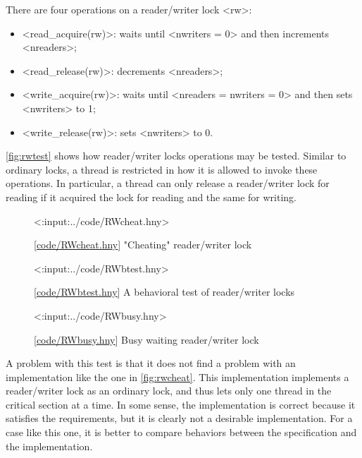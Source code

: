 \documentclass{report}
\newcommand{\harmonylink}[1]{%
[\href{https://harmony.cs.cornell.edu/#1}{\underline{#1}}]%
}
\newenvironment{code}{
\tcolorbox
}{
\endtcolorbox
}
\begin{document}
There are four operations on a reader/writer lock <{rw}>:
\begin{itemize}
\item <{read_acquire(rw)}>: waits until <{nwriters = 0}>
and then increments <{nreaders}>;
\item <{read_release(rw)}>: decrements <{nreaders}>;
\item <{write_acquire(rw)}>: waits until <{nreaders = nwriters = 0}>
and then sets <{nwriters}> to 1;
\item <{write_release(rw)}>: sets <{nwriters}> to 0.
\end{itemize}

\autoref{fig:rwtest} shows how reader/writer locks operations
may be tested.
Similar to ordinary locks, a thread is restricted in how it is allowed to
invoke these operations.
In particular, a thread can only release a reader/writer lock for reading
if it acquired the lock for reading and the same for writing.

\begin{figure}
\begin{code}
<{:input:../code/RWcheat.hny}>
\end{code}
\caption{\harmonylink{code/RWcheat.hny} "Cheating" reader/writer lock}
\label{fig:rwcheat}
\end{figure}

\begin{figure}
\begin{code}
<{:input:../code/RWbtest.hny}>
\end{code}
\caption{\harmonylink{code/RWbtest.hny} A behavioral test of reader/writer locks}
\label{fig:rwbtest}
\end{figure}

\begin{figure}
\begin{code}
<{:input:../code/RWbusy.hny}>
\end{code}
\caption{\harmonylink{code/RWbusy.hny} Busy waiting reader/writer lock}
\label{fig:rwbusy}
\end{figure}

A problem with this test is that it does not find a problem
with an implementation like the one in \autoref{fig:rwcheat}.
This implementation implements a reader/writer lock as an ordinary
lock, and thus lets only one thread in the critical section at a time.
In some sense, the implementation is correct because it satisfies
the requirements, but it is clearly not a desirable implementation.
For a case like this one, it is better to compare behaviors between
the specification and the implementation.
\end{document}
